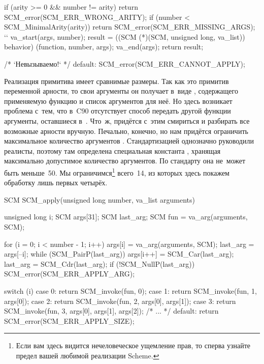 \begin{code:c}
{{{        if (arity >= 0 && number != arity) {
            return SCM_error(SCM_ERR_WRONG_ARITY);
        }
        if (number < SCM_MinimalArity(arity)) {
            return SCM_error(SCM_ERR_MISSING_ARGS);
        }
``
        va_start(args, number);
        result = ((SCM (*)(SCM, unsigned long, va_list)) behavior)
                 (function, number, args);
        va_end(args);
        return result;
      }

      /* `Невызываемо!` */
      default:
        SCM_error(SCM_ERR_CANNOT_APPLY);
    }
}
\end{code:c}

Реализация примитива  имеет сравнимые размеры. Так как это примитив
переменной арности, то свои аргументы он получает в~виде ,
содержащего применяемую функцию и список аргументов для неё. Но здесь возникает
проблема с~тем, что в~C90 отсутствует способ передать другой
функции аргументы, оставшиеся в~. Что~ж, придётся с~этим смириться
и разбирать все возможные арности вручную. Печально, конечно, но нам придётся
ограничить максимальное количество аргументов . Стандартизацией
{\CommonLisp} однозначно руководили реалисты, поэтому там определена специальная
константа , хранящая максимально допустимое количество
аргументов. По стандарту она не~может быть меньше~50. Мы ограничимся\footnote{%
Если вам здесь видится нечеловеческое ущемление прав, то сперва узнайте предел
вашей любимой реализации Scheme.} всего~14, из которых здесь покажем обработку
лишь первых четырёх.

\begin{code:c}
SCM SCM_apply(unsigned long number, va_list arguments)
{
    unsigned long i;
    SCM args[31];
    SCM last_arg;
    SCM fun = va_arg(arguments, SCM);

    for (i = 0; i < number - 1; i++) {
        args[i] = va_arg(arguments, SCM);
    }
    last_arg = args[--i];
    while (SCM_PairP(last_arg)) {
        args[i++] = SCM_Car(last_arg);
        last_arg = SCM_Cdr(last_arg);
    }
    if (!SCM_NullP(last_arg)) {
        SCM_error(SCM_ERR_APPLY_ARG);
    }

    switch (i) {
      case 0: return SCM_invoke(fun, 0);
      case 1: return SCM_invoke(fun, 1, args[0]);
      case 2: return SCM_invoke(fun, 2, args[0], args[1]);
      case 3: return SCM_invoke(fun, 3, args[0], args[1], args[2]);
      /* ... */
      default: return SCM_error(SCM_ERR_APPLY_SIZE);
    }
}
\end{code:c}

